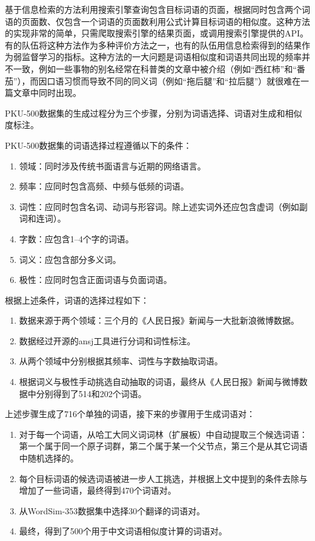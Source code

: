 基于信息检索的方法利用搜索引擎查询包含目标词语的页面，根据同时包含两个词语的页面数、仅包含一个词语的页面数利用公式计算目标词语的相似度。这种方法的实现非常的简单，只需爬取搜索引擎的结果页面，或调用搜索引擎提供的API。有的队伍将这种方法作为多种评价方法之一，也有的队伍用信息检索得到的结果作为弱监督学习的指标。这种方法的一大问题是词语相似度和词语共同出现的频率并不一致，例如一些事物的别名经常在科普类的文章中被介绍（例如“西红柿”和“番茄”），而因口语习惯而导致不同的同义词（例如“拖后腿”和“拉后腿”）就很难在一篇文章中同时出现。

PKU-500数据集的生成过程分为三个步骤，分别为词语选择、词语对生成和相似度标注。

PKU-500数据集的词语选择过程遵循以下的条件：
\begin{enumerate}
	\item 领域：同时涉及传统书面语言与近期的网络语言。
	\item 频率：应同时包含高频、中频与低频的词语。
	\item 词性：应同时包含名词、动词与形容词。除上述实词外还应包含虚词（例如副词和连词）。
	\item 字数：应包含1--4个字的词语。
	\item 词义：应包含部分多义词。
	\item 极性：应同时包含正面词语与负面词语。
\end{enumerate}
根据上述条件，词语的选择过程如下：
\begin{enumerate}
	\item 数据来源于两个领域：三个月的《人民日报》新闻与一大批新浪微博数据。
	\item 数据经过开源的ansj工具进行分词和词性标注。
	\item 从两个领域中分别根据其频率、词性与字数抽取词语。
	\item 根据词义与极性手动挑选自动抽取的词语，最终从《人民日报》新闻与微博数据中分别得到了514和202个词语。
\end{enumerate}

上述步骤生成了716个单独的词语，接下来的步骤用于生成词语对：
\begin{enumerate}
	\item 对于每一个词语，从哈工大同义词词林（扩展板）中自动提取三个候选词语：第一个属于同一个原子词群，第二个属于某一个父节点，第三个是从其它词语中随机选择的。
	\item 每个目标词语的候选词语被进一步人工挑选，并根据上文中提到的条件去除与增加了一些词语，最终得到470个词语对。
	\item 从WordSim-353数据集中选择30个翻译的词语对。
	\item 最终，得到了500个用于中文词语相似度计算的词语对。
\end{enumerate}

